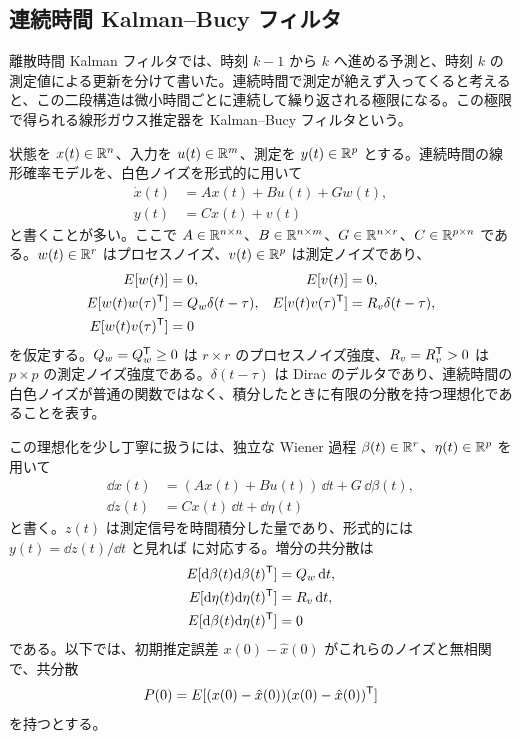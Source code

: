 \subsection{連続時間 Kalman--Bucy フィルタ}

離散時間 Kalman フィルタでは、時刻 $k-1$ から $k$ へ進める予測と、時刻 $k$ の測定値による更新を分けて書いた。連続時間で測定が絶えず入ってくると考えると、この二段構造は微小時間ごとに連続して繰り返される極限になる。この極限で得られる線形ガウス推定器を Kalman--Bucy フィルタという。

状態を $x(t)\in\mathbb{R}^n$、入力を $u(t)\in\mathbb{R}^m$、測定を $y(t)\in\mathbb{R}^p$ とする。連続時間の線形確率モデルを、白色ノイズを形式的に用いて
\begin{align}
  \dot{x}(t)&=Ax(t)+Bu(t)+Gw(t),\\
  y(t)&=Cx(t)+v(t)
  \label{eq:kb-formal-model}
\end{align}
と書くことが多い。ここで $A\in\mathbb{R}^{n\times n}$、$B\in\mathbb{R}^{n\times m}$、$G\in\mathbb{R}^{n\times r}$、$C\in\mathbb{R}^{p\times n}$ である。$w(t)\in\mathbb{R}^r$ はプロセスノイズ、$v(t)\in\mathbb{R}^p$ は測定ノイズであり、
\begin{align}
  E[w(t)]&=0,
  &E[v(t)]&=0,\\
  E[w(t)w(\tau)^{\mathsf{T}}]&=Q_w\delta(t-\tau),
  &E[v(t)v(\tau)^{\mathsf{T}}]&=R_v\delta(t-\tau),\\
  E[w(t)v(\tau)^{\mathsf{T}}]&=0
\end{align}
を仮定する。$Q_w=Q_w^{\mathsf{T}}\ge0$ は $r\times r$ のプロセスノイズ強度、$R_v=R_v^{\mathsf{T}}>0$ は $p\times p$ の測定ノイズ強度である。$\delta(t-\tau)$ は Dirac のデルタであり、連続時間の白色ノイズが普通の関数ではなく、積分したときに有限の分散を持つ理想化であることを表す。

この理想化を少し丁寧に扱うには、独立な Wiener 過程 $\beta(t)\in\mathbb{R}^r$、$\eta(t)\in\mathbb{R}^p$ を用いて
\begin{align}
  \dd x(t)&=(Ax(t)+Bu(t))\,\dd t+G\,\dd\beta(t),\\
  \dd z(t)&=Cx(t)\,\dd t+\dd\eta(t)
  \label{eq:kb-stochastic-model}
\end{align}
と書く。$z(t)$ は測定信号を時間積分した量であり、形式的には $y(t)=\dd z(t)/\dd t$ と見れば  に対応する。増分の共分散は
\begin{align}
  E[\mathrm{d}\beta(t)\mathrm{d}\beta(t)^{\mathsf{T}}]&=Q_w\,\mathrm{d} t,\\
  E[\mathrm{d}\eta(t)\mathrm{d}\eta(t)^{\mathsf{T}}]&=R_v\,\mathrm{d} t,\\
  E[\mathrm{d}\beta(t)\mathrm{d}\eta(t)^{\mathsf{T}}]&=0
\end{align}
である。以下では、初期推定誤差 $x(0)-\hat{x}(0)$ がこれらのノイズと無相関で、共分散
\begin{equation}
  P(0)=E[(x(0)-\hat{x}(0))(x(0)-\hat{x}(0))^{\mathsf{T}}]
\end{equation}
を持つとする。


